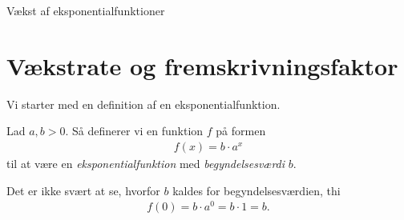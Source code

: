 \documentclass[12pt]{article}
\begin{document}



\begin{center}
\Huge
Vækst af eksponentialfunktioner
\end{center}
\section*{Vækstrate og fremskrivningsfaktor}

Vi starter med en definition af en eksponentialfunktion.
\begin{defn}[Eksponentialfunktion]
	Lad $a,b>0$. Så definerer vi en funktion $f$ på formen 
	\begin{align*}
		f(x) = b\cdot a^x
	\end{align*}
	til at være en \textit{eksponentialfunktion} med \textit{begyndelsesværdi} $b$. 
\end{defn}

Det er ikke svært at se, hvorfor $b$ kaldes for begyndelsesværdien, thi
\begin{align*}
	f(0) = b\cdot a^0 = b\cdot 1 = b.
\end{align*}
\end{document}
